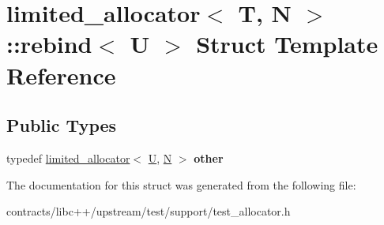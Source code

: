 \hypertarget{structlimited__allocator_1_1rebind}{}\section{limited\+\_\+allocator$<$ T, N $>$\+:\+:rebind$<$ U $>$ Struct Template Reference}
\label{structlimited__allocator_1_1rebind}
\subsection*{Public Types}
\begin{DoxyCompactItemize}
\item 
\mbox{\label{structlimited__allocator_1_1rebind_aea9279d2f0dc6cd23d28a25412a5c443}} 
typedef \mbox{\hyperlink{classlimited__allocator}{limited\+\_\+allocator}}$<$ \mbox{\hyperlink{union_u}{U}}, \mbox{\hyperlink{group__types_gaf9c1edb0e0da55ec6ba09f32f6839529}{N}} $>$ {\bfseries other}
\end{DoxyCompactItemize}


The documentation for this struct was generated from the following file\+:\begin{DoxyCompactItemize}
\item 
contracts/libc++/upstream/test/support/test\+\_\+allocator.\+h\end{DoxyCompactItemize}
